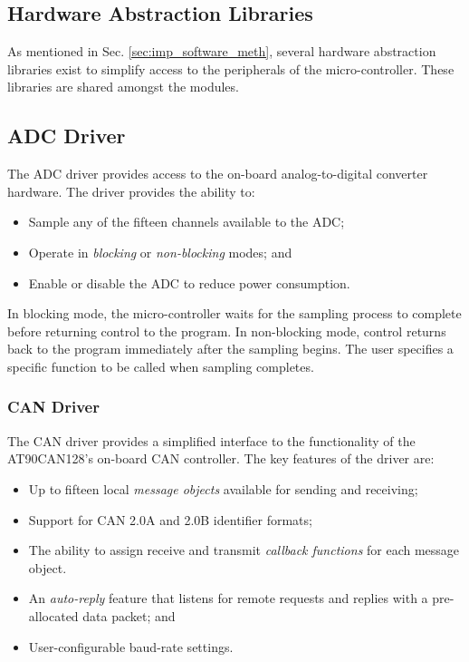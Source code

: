 \subsection{Hardware Abstraction Libraries}

As mentioned in Sec. \ref{sec:imp_software_meth}, several hardware abstraction libraries exist to simplify access to the peripherals of the micro-controller. These libraries are shared amongst the modules. 

\subsection{ADC Driver}

The ADC driver provides access to the on-board analog-to-digital converter hardware. The driver provides the ability to:

\begin{itemize}
	\item Sample any of the fifteen channels available to the ADC; 
	\item Operate in \emph{blocking} or \emph{non-blocking} modes; and
	\item Enable or disable the ADC to reduce power consumption.
\end{itemize}

In blocking mode, the micro-controller waits for the sampling process to complete before returning control to the program. In non-blocking mode, control returns back to the program immediately after the sampling begins. The user specifies a specific function to be called when sampling completes. 

\subsubsection{CAN Driver}

The CAN driver provides a simplified interface to the functionality of the AT90CAN128's on-board CAN controller. The key features of the driver are:

\begin{itemize}
	\item Up to fifteen local \emph{message objects} available for sending and receiving;
	\item Support for CAN 2.0A and 2.0B identifier formats;
	\item The ability to assign receive and transmit \emph{callback functions} for each message object.
	\item An \emph{auto-reply} feature that listens for remote requests and replies with a pre-allocated data packet; and
	\item User-configurable baud-rate settings.
\end{itemize}

